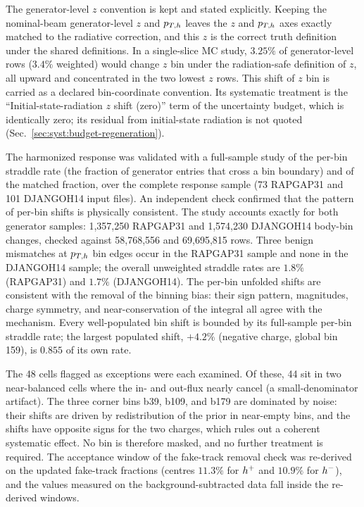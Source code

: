 The generator-level $z$ convention is kept and stated explicitly.  Keeping
the nominal-beam generator-level $z$ and $p_{T,h}$ leaves the $z$ and $p_{T,h}$
axes exactly matched to the radiative correction, and this $z$ is the
correct truth definition under the shared definitions.  In a single-slice MC
study, $3.25\%$ of generator-level rows ($3.4\%$ weighted) would change $z$
bin under the radiation-safe definition of $z$, all upward and concentrated
in the two lowest $z$ rows.  This shift of $z$ bin is carried as a declared
bin-coordinate convention.  Its systematic treatment is the
``Initial-state-radiation $z$ shift (zero)'' term of the uncertainty budget,
which is identically zero; its residual from initial-state radiation is not
quoted (Sec.~\ref{sec:syst:budget-regeneration}).

The harmonized response was validated with a full-sample study of the
per-bin straddle rate (the fraction of generator entries that cross a bin
boundary) and of the matched fraction, over the complete response sample (73
RAPGAP31 and 101 DJANGOH14 input files).  An independent check confirmed that
the pattern of per-bin shifts is physically consistent.  The study accounts
exactly for both generator samples: 1{,}357{,}250 RAPGAP31 and 1{,}574{,}230
DJANGOH14 body-bin changes, checked against 58{,}768{,}556 and 69{,}695{,}815
rows.  Three benign mismatches at $p_{T,h}$ bin edges occur in the RAPGAP31
sample and none in the DJANGOH14 sample; the overall unweighted straddle
rates are $1.8\%$ (RAPGAP31) and $1.7\%$ (DJANGOH14).  The per-bin unfolded
shifts are consistent with the removal of the binning bias: their sign
pattern, magnitudes, charge symmetry, and near-conservation of the integral
all agree with the mechanism.  Every well-populated bin shift is bounded by
its full-sample per-bin straddle rate; the largest populated shift,
$+4.2\%$ (negative charge, global bin 159), is $0.855$ of its own rate.

The 48 cells flagged as exceptions were each examined.  Of these, 44 sit in
two near-balanced cells where the in- and out-flux nearly cancel (a
small-denominator artifact).  The three corner bins b39, b109, and b179 are
dominated by noise: their shifts are driven by redistribution of the prior in
near-empty bins, and the shifts have opposite signs for the two charges,
which rules out a coherent systematic effect.  No bin is therefore masked,
and no further treatment is required.  The
acceptance window of the fake-track removal check was re-derived on the
updated fake-track fractions (centres $11.3\%$ for $h^{+}$ and $10.9\%$ for
$h^{-}$), and the values measured on the background-subtracted data fall
inside the re-derived windows.


